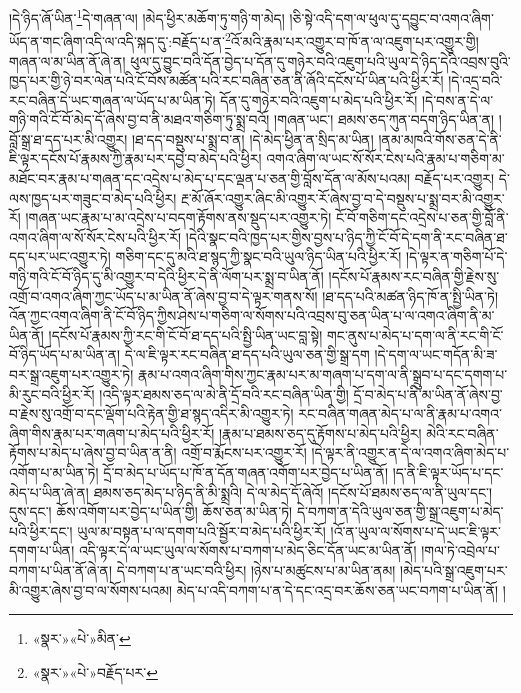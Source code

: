 །དེ་ཉིད་ཞོ་ཡིན་\footnote{«སྣར་»«པེ་»མིན་}དེ་གཞན་ལ། །མེད་ཕྱིར་མཆོག་ཏུ་གཉི་ག་མེད། །ཅི་སྟེ་འདི་དག་ལ་ཕུལ་དུ་དབྱུང་བ་འགའ་ཞིག་ཡོད་ན་གང་ཞིག་འདི་ལ་འདི་སྐད་དུ་:བརྗོད་པ་ན་\footnote{«སྣར་»«པེ་»བརྗོད་པར་}འོ་མའི་རྣམ་པར་འགྱུར་བ་ཁོ་ན་ལ་འཇུག་པར་འགྱུར་གྱི། གཞན་ལ་མ་ཡིན་ནོ་ཞེ་ན། ཕུལ་དུ་བྱུང་བའི་དོན་བྱེད་པ་དོན་དུ་གཉེར་བའི་འཇུག་པའི་ཡུལ་དེ་ཉིད་དེའི་འབྲས་བུའི་ཁྱད་པར་གྱི་ཉེ་བར་ལེན་པའི་ངོ་བོས་མཚོན་པའི་རང་བཞིན་ཅན་ནི་ཞོའི་དངོས་པོ་ཡིན་པའི་ཕྱིར་རོ། །དེ་འདྲ་བའི་རང་བཞིན་དེ་ཡང་གཞན་ལ་ཡོད་པ་མ་ཡིན་ཏེ། དོན་དུ་གཉེར་བའི་འཇུག་པ་མེད་པའི་ཕྱིར་རོ། །དེ་བས་ན་དེ་ལ་གཉི་གའི་ངོ་བོ་མེད་དོ་ཞེས་བྱ་བ་ནི་མཐའ་གཅིག་ཏུ་སྨྲ་བའོ། །གཞན་ཡང་། ཐམས་ཅད་ཀུན་བདག་ཉིད་ཡིན་ན། །བློ་སྒྲ་ཐ་དད་པར་མི་འགྱུར། །ཐ་དད་བསྡུས་པ་སྨྲ་བ་ན། །དེ་མེད་ཕྱིན་ན་སྲིད་མ་ཡིན། །ནམ་མཁའི་གོས་ཅན་དེ་ནི་ཇི་ལྟར་དངོས་པོ་རྣམས་ཀྱི་རྣམ་པར་དབྱེ་བ་མེད་པའི་ཕྱིར། འགའ་ཞིག་ལ་ཡང་སོ་སོར་ངེས་པའི་རྣམ་པ་གཅིག་མ་མཐོང་བར་རྣམ་པ་གཞན་དང་འདྲེས་པ་མེད་པ་དང་ལྡན་པ་ཅན་གྱི་བློས་དོན་ལ་མོས་པའམ། བརྗོད་པར་འགྱུར། དེ་ལས་ཁྱད་པར་གཟུང་བ་མེད་པའི་ཕྱིར། རྔ་མོ་ཞོར་འགྱུར་ཞིང་མི་འགྱུར་རོ་ཞེས་བྱ་བ་དེ་བསྡུས་པ་སྨྲ་བར་མི་འགྱུར་རོ། །གཞན་ཡང་རྣམ་པ་མ་འདྲེས་པ་བདག་རྟོགས་ནས་སྡུད་པར་འགྱུར་ཏེ། ངོ་བོ་གཅིག་དང་འདྲེས་པ་ཅན་གྱི་བློ་ནི་འགའ་ཞིག་ལ་སོ་སོར་ངེས་པའི་ཕྱིར་རོ། །དེའི་སྣང་བའི་ཁྱད་པར་གྱིས་བྱས་པ་ཉིད་ཀྱི་ངོ་བོ་དེ་དག་ནི་རང་བཞིན་ཐ་དད་པར་ཡང་འགྱུར་ཏེ། གཅིག་དང་དུ་མའི་ཐ་སྙད་ཀྱི་སྣང་བའི་ཡུལ་ཉིད་ཡིན་པའི་ཕྱིར་རོ། །དེ་ལྟར་ན་གཅིག་པོ་དེ་གཉི་གའི་ངོ་བོ་ཉིད་དུ་མི་འགྱུར་བ་དེའི་ཕྱིར་དེ་ནི་ལོག་པར་སྨྲ་བ་ཡིན་ནོ། །དངོས་པོ་རྣམས་རང་བཞིན་གྱི་རྗེས་སུ་འགྲོ་བ་འགའ་ཞིག་ཀྱང་ཡོད་པ་མ་ཡིན་ནོ་ཞེས་བྱ་བ་དེ་ལྟར་གནས་སོ། །ཐ་དད་པའི་མཚན་ཉིད་ཁོ་ན་སྤྱི་ཡིན་ཏེ། འོན་ཀྱང་འགའ་ཞིག་ནི་ངོ་བོ་ཉིད་ཀྱིས་ཤེས་པ་གཅིག་ལ་སོགས་པའི་འབྲས་བུ་ཅན་ཡིན་པ་ལ་འགའ་ཞིག་ནི་མ་ཡིན་ནོ། །དངོས་པོ་རྣམས་ཀྱི་རང་གི་ངོ་བོ་ཐ་དད་པའི་སྤྱི་ཡིན་ཡང་བླ་སྟེ། གང་ནུས་པ་མེད་པ་དག་ལ་ནི་རང་གི་ངོ་བོ་ཉིད་ཡོད་པ་མ་ཡིན་ན། དེ་ལ་ཇི་ལྟར་རང་བཞིན་ཐ་དད་པའི་ཡུལ་ཅན་གྱི་སྒྲ་དག །དེ་དག་ལ་ཡང་གདོན་མི་ཟ་བར་སྒྲ་འཇུག་པར་འགྱུར་ཏེ། རྣམ་པ་འགའ་ཞིག་གིས་ཀྱང་རྣམ་པར་མ་གཞག་པ་དག་ལ་ནི་སྒྲུབ་པ་དང་དགག་པ་མི་རུང་བའི་ཕྱིར་རོ། །འདི་ལྟར་ཐམས་ཅད་ལ་མེ་ནི་དྲོ་བའི་རང་བཞིན་ཡིན་གྱི། དྲོ་བ་མེད་པ་ནི་མ་ཡིན་ནོ་ཞེས་བྱ་བ་རྗེས་སུ་འགྲོ་བ་དང་ལྡོག་པའི་རྟེན་གྱི་ཐ་སྙད་འདིར་མི་འགྱུར་ཏེ། རང་བཞིན་གཞན་མེད་པ་ལ་ནི་རྣམ་པ་འགའ་ཞིག་གིས་རྣམ་པར་གཞག་པ་མེད་པའི་ཕྱིར་རོ། །རྣམ་པ་ཐམས་ཅད་དུ་རྟོགས་པ་མེད་པའི་ཕྱིར། མེའི་རང་བཞིན་རྟོགས་པ་མེད་པ་ཞེས་བྱ་བ་ཡིན་ན་ནི། འགྲོ་བ་རྨོངས་པར་འགྱུར་རོ། །དེ་ལྟར་ནི་འགྱུར་ན་དེ་ལ་འགའ་ཞིག་མེད་པ་འགོག་པ་མ་ཡིན་ཏེ། དྲོ་བ་མེད་པ་ཡོད་པ་ཁོ་ན་དོན་གཞན་འགོག་པར་བྱེད་པ་ཡིན་ནོ། །ད་ནི་ཇི་ལྟར་ཡོད་པ་དང་མེད་པ་ཡིན་ཞེ་ན། ཐམས་ཅད་མེད་པ་ཉིད་ནི་མི་སྨྲའི། དེ་ལ་མེད་དོ་ཞེའོ། །དངོས་པོ་ཐམས་ཅད་ལ་ནི་ཡུལ་དང་། དུས་དང་། ཆོས་འགོག་པར་བྱེད་པ་ཡིན་གྱི། ཆོས་ཅན་མ་ཡིན་ཏེ། དེ་བཀག་ན་དེའི་ཡུལ་ཅན་གྱི་སྒྲ་འཇུག་པ་མེད་པའི་ཕྱིར་དང་། ཡུལ་མ་བསྟན་པ་ལ་དགག་པའི་སྦྱོར་བ་མེད་པའི་ཕྱིར་རོ། །འོ་ན་ཡུལ་ལ་སོགས་པ་དེ་ཡང་ཇི་ལྟར་དགག་པ་ཡིན། འདི་ལྟར་དེ་ལ་ཡང་ཡུལ་ལ་སོགས་པ་བཀག་པ་མེད་ཅིང་དོན་ཡང་མ་ཡིན་ནོ། །གལ་ཏེ་འབྲེལ་པ་བཀག་པ་ཡིན་ནོ་ཞེ་ན། དེ་བཀག་པ་ན་ཡང་བའི་ཕྱིར། །ཉེས་པ་མཚུངས་པ་མ་ཡིན་ནམ། །མེད་པའི་སྒྲ་འཇུག་པར་མི་འགྱུར་ཞེས་བྱ་བ་ལ་སོགས་པའམ། མེད་པ་འདི་བཀག་པ་ན་དེ་དང་འདྲ་བར་ཆོས་ཅན་ཡང་བཀག་པ་ཡིན་ནོ། །

